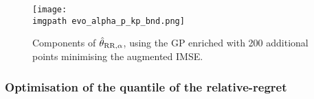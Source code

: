 \documentclass[../../Main_ManuscritThese.tex]{subfiles}
\newcommand\imgpath{/home/victor/acadwriting/Manuscrit/Text/Chapter5/img/}
\begin{document}

\begin{figure}[ht]
  \centering
  \texttt{[image: \\imgpath evo\_alpha\_p\_kp\_bnd.png]}
  \caption[Components of $\hat{\kk}_{\mathrm{RR},\alpha}$ after
  augmented IMSE reduction]{\label{fig:evo_alphap_kp} Components of
    $\hat{\kk}_{\mathrm{RR},\alpha}$, using the GP enriched with 200
    additional points minimising the augmented IMSE.}
\end{figure}



\clearpage
\subsubsection{Optimisation of the quantile of the relative-regret}
\label{ssec:optim_quantile_rr}
\end{document}

